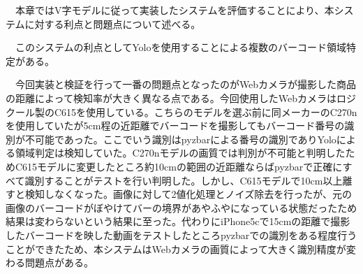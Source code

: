 　本章ではV字モデルに従って実装したシステムを評価することにより、本システムに対する利点と問題点について述べる。

　このシステムの利点としてYoloを使用することによる複数のバーコード領域特定がある。

　今回実装と検証を行って一番の問題点となったのがWebカメラが撮影した商品の距離によって検知率が大きく異なる点である。今回使用したWebカメラはロジクール製のC615を使用している。こちらのモデルを選ぶ前に同メーカーのC270nを使用していたが5cm程の近距離でバーコードを撮影してもバーコード番号の識別が不可能であった。ここでいう識別はpyzbarによる番号の識別でありYoloによる領域判定は検知していた。C270nモデルの画質では判別が不可能と判明したためC615モデルに変更したところ約10cmの範囲の近距離ならばpyzbarで正確にすべて識別することがテストを行い判明した。しかし、C615モデルで10cm以上離すと検知しなくなった。画像に対して2値化処理とノイズ除去を行ったが、元の画像のバーコードがぼやけてバーの境界があやふやになっている状態だったため結果は変わらないという結果に至った。代わりにiPhone5cで15cmの距離で撮影したバーコードを映した動画をテストしたところpyzbarでの識別をある程度行うことができたため、本システムはWebカメラの画質によって大きく識別精度が変わる問題点がある。